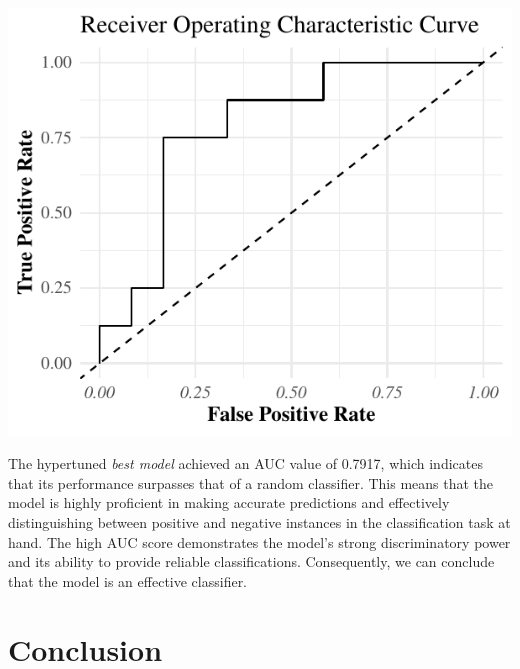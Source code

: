 \documentclass[11pt,preprint, authoryear]{elsarticle}
\let\origfigure\figure
\let\endorigfigure\endfigure
\renewenvironment{figure}[1][2] {
    \expandafter\origfigure\expandafter[H]
} {
    \endorigfigure
}
\numberwithin{equation}{section}
\numberwithin{figure}{section}
\numberwithin{table}{section}
\begin{document}
\begin{figure}[H]

{\centering \includegraphics{Taylor-Swift-Report_files/figure-latex/Figure5-1} 

}

\caption{Receiver Operating Characteristic Curve \label{Figure5}}\label{fig:Figure5}
\end{figure}

The hypertuned \emph{best model} achieved an AUC value of 0.7917, which
indicates that its performance surpasses that of a random classifier.
This means that the model is highly proficient in making accurate
predictions and effectively distinguishing between positive and negative
instances in the classification task at hand. The high AUC score
demonstrates the model's strong discriminatory power and its ability to
provide reliable classifications. Consequently, we can conclude that the
model is an effective classifier.

\hypertarget{conclusion}{%
\section{Conclusion}\label{conclusion}}
\end{document}
